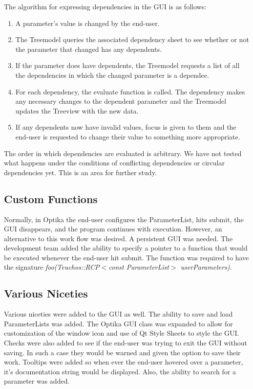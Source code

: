 	The algorithm for expressing dependencies in the GUI is as follows:
	\begin{enumerate}
		\item A parameter's value is changed by the end-user.
		\item The Treemodel queries the associated dependency sheet to see whether or not the parameter that changed has any dependents.
		\item If the parameter does have dependents, the Treemodel requests a list of all the dependencies in which the changed
		parameter is a dependee.
		\item For each dependency, the evaluate function is called. The dependency makes any necessary changes to the dependent parameter
		and the Treemodel updates the Treeview with the new data.
		\item If any dependents now have invalid values, focus is given to them and the end-user is requested to change their value to
		something more appropriate.
	\end{enumerate}

The order in which dependencies are evaluated is arbitrary. We have not
tested what happens under the conditions of conflicting dependencies or 
circular dependencies yet. This is an area for further study.

	\subsection{Custom Functions}
	Normally, in Optika the end-user configures the ParameterList, hits submit, the GUI disappears, and the program continues with execution. However,
	an alternative to this work flow was desired. A persistent GUI was needed. The development team added the ability to specify a pointer to a function
	that would be executed whenever the end-user hit submit. The function was required to have the signature \emph{foo(Teuchos::RCP$<$const ParameterList$>$ userParameters)}.

	\subsection{Various Niceties}
	Various niceties were added to the GUI as well. The ability to save and load ParameterLists was added. The Optika GUI class was expanded to allow for
	customization of the window icon and use of Qt Style Sheets to style the GUI. Checks were also added to see if the end-user was trying to exit the GUI without
	saving. In such a case they would be warned and given the option to save their work. Tooltips were added so when ever the end-user hovered over a parameter, it's 
	documentation string would be displayed. Also, the ability to search for a parameter was added.

